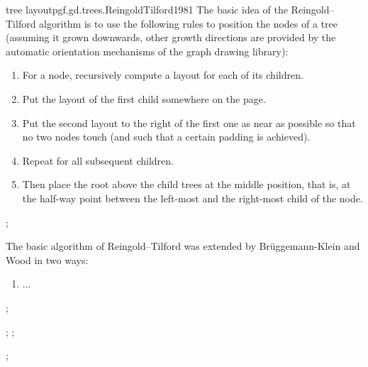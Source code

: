 \begin{gdalgorithm}{tree layout}{pgf.gd.trees.ReingoldTilford1981}
  The basic idea of the Reingold--Tilford algorithm is to use the
  following rules to position the nodes of a tree (assuming it grown
  downwards, other growth directions are provided by the automatic
  orientation mechanisms of the graph drawing library):
  \begin{enumerate}
  \item For a node, recursively compute a layout for each of its children.
  \item Put the layout of the first child somewhere on the page.
  \item Put the second layout to the right of the first one as near as
    possible so that no two nodes touch (and such that a certain
    padding is achieved).
  \item Repeat for all subsequent children.
  \item Then place the root above the child trees at the middle
    position, that is, at the half-way point between the left-most and
    the right-most child of the node.    
  \end{enumerate}
\begin{codeexample}[]
\tikz [tree layout={significant sep=0}, sibling distance=8mm]
;
\end{codeexample}
  The basic algorithm of Reingold--Tilford was extended by
  Br\"uggemann-Klein and Wood in two ways:
  \begin{enumerate}
  \item ...
  \end{enumerate}

\begin{codeexample}[]
\tikz [binary tree layout, sibling distance=7mm, level distance=10mm]
\graph [nodes={circle, inner sep=0pt, minimum size=2mm, fill}]{
  / -- { / -- / -- { / -- /, / -- { /, / }}, / -- / -- /[second] }
};
\end{codeexample}
\begin{codeexample}[]
\tikz {};\qquad
\tikz {};
\end{codeexample}
\begin{codeexample}[]
\tikz {};
\end{codeexample}
\end{gdalgorithm}




